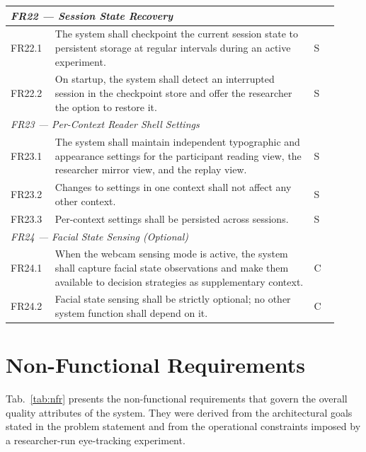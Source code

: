 \begin{longtable}{%
  p{0.12\linewidth}
  p{0.73\linewidth}
  p{0.07\linewidth}
}
\multicolumn{3}{l}{\textit{FR22 — Session State Recovery}} \\
\midrule
FR22.1 & The system shall checkpoint the current session state to persistent
         storage at regular intervals during an active experiment. & S \\
FR22.2 & On startup, the system shall detect an interrupted session in the
         checkpoint store and offer the researcher the option to restore it. & S \\
\midrule

\multicolumn{3}{l}{\textit{FR23 — Per-Context Reader Shell Settings}} \\
\midrule
FR23.1 & The system shall maintain independent typographic and appearance
         settings for the participant reading view, the researcher mirror
         view, and the replay view. & S \\
FR23.2 & Changes to settings in one context shall not affect any other
         context. & S \\
FR23.3 & Per-context settings shall be persisted across sessions. & S \\
\midrule

\multicolumn{3}{l}{\textit{FR24 — Facial State Sensing (Optional)}} \\
\midrule
FR24.1 & When the webcam sensing mode is active, the system shall capture
         facial state observations and make them available to decision
         strategies as supplementary context. & C \\
FR24.2 & Facial state sensing shall be strictly optional; no other system
         function shall depend on it. & C \\

\end{longtable}
\endgroup


\section{Non-Functional Requirements}
\label{sec:non-functional-requirements}

Tab.~\ref{tab:nfr} presents the non-functional requirements that govern the
overall quality attributes of the system.
They were derived from the architectural goals stated in the problem statement
and from the operational constraints imposed by a researcher-run eye-tracking
experiment.

